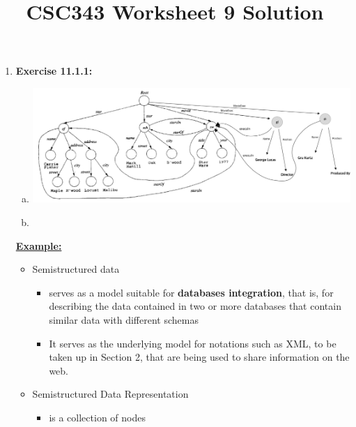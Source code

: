 \documentclass[12pt]{article}
\begin{document}
\title{CSC343 Worksheet 9 Solution}
\maketitle

\bigskip

\begin{enumerate}[1.]
    \item \textbf{Exercise 11.1.1:}

    \bigskip

    \begin{enumerate}[a)]
        \item

    \begin{center}
    \includegraphics[width=\linewidth]{images/worksheet_9_solution_4.png}
    \end{center}

        \item



    \end{enumerate}

    \underline{\textbf{Example:}}

    \begin{itemize}
        \item Semistructured data
        \begin{itemize}
            \item serves as a model suitable for \textbf{databases integration}, that is,
            for describing the data contained in two or more databases that contain similar data with
            different schemas

            \item It serves as the underlying model for notations such as XML, to be taken
            up in Section 2, that are being used to share information on the web.
        \end{itemize}

        \item Semistructured Data Representation
        \begin{itemize}
            \item is a collection of nodes


\end{itemize}
\end{itemize}
\end{enumerate}
\end{document}
